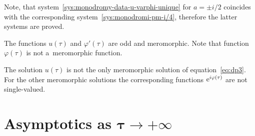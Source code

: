 \documentclass[pdftex]{sigma}
\numberwithin{equation}{section}
\begin{document}
\begin{Remark}Note, that system~\eqref{sys:monodromy-data-u-varphi-unique} for $a=\pm i/2$ coincides with
the corresponding system~\eqref{sys:monodromi-pm-i/4}, therefore the latter systems are proved.
\end{Remark}
\begin{Remark}The functions $u(\tau)$ and $\varphi'(\tau)$ are odd and meromorphic. Note that function $\varphi(\tau)$ is not a~meromorphic function.
\end{Remark}
\begin{Remark}The solution $u(\tau)$ is not the only meromorphic solution of equation~\eqref{eq:dp3}. For the other
meromorphic solutions the corresponding functions ${\rm e}^{i\varphi(\tau)}$ are not single-valued.
\end{Remark}

\section[Asymptotics as $\tau\to+\infty$]{Asymptotics as $\boldsymbol{\tau\to+\infty}$}\label{sec:asymptotics}
\end{document}
